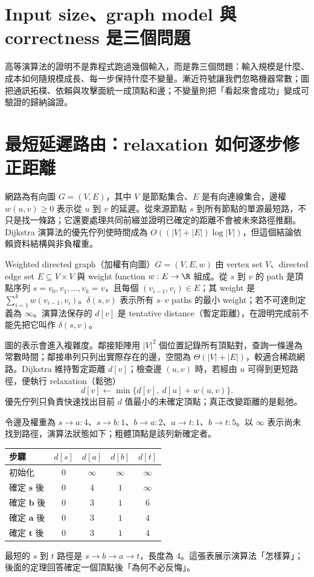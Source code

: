 \documentclass[11pt,a4paper,oneside,openany]{book}
\begin{document}
\section{Input size、graph model 與 correctness 是三個問題}
高等演算法的證明不是靠程式跑過幾個輸入，而是靠三個問題：輸入規模是什麼、成本如何隨規模成長、每一步保持什麼不變量。漸近符號讓我們忽略機器常數；圖把通訊拓樸、依賴與攻擊面統一成頂點和邊；不變量則把「看起來會成功」變成可驗證的歸納論證。

\section{最短延遲路由：relaxation 如何逐步修正距離}
網路為有向圖 $G=(V,E)$，其中 $V$ 是節點集合、$E$ 是有向連線集合，邊權 $w(u,v)\ge0$ 表示從 $u$ 到 $v$ 的延遲。從來源節點 $s$ 到所有節點的單源最短路，不只是找一條路；它還要處理共同前綴並證明已確定的距離不會被未來路徑推翻。Dijkstra 演算法的優先佇列使時間成為 $O((|V|+|E|)\log |V|)$，但這個結論依賴資料結構與非負權重。

\begin{definition}
Weighted directed graph（加權有向圖）$G=(V,E,w)$ 由 vertex set $V$、directed edge set $E\subseteq V\times V$ 與 weight function $w:E\to\R$ 組成。從 $s$ 到 $v$ 的 path 是頂點序列 $s=v_0,v_1,\ldots,v_k=v$，且每個 $(v_{i-1},v_i)\in E$；其 weight 是 $\sum_{i=1}^k w(v_{i-1},v_i)$。$\delta(s,v)$ 表示所有 $s$--$v$ paths 的最小 weight；若不可達則定義為 $\infty$。演算法保存的 $d[v]$ 是 tentative distance（暫定距離），在證明完成前不能先把它叫作 $\delta(s,v)$。
\end{definition}

圖的表示會進入複雜度。鄰接矩陣用 $|V|^2$ 個位置記錄所有頂點對，查詢一條邊為常數時間；鄰接串列只列出實際存在的邊，空間為 $\Theta(|V|+|E|)$，較適合稀疏網路。Dijkstra 維持暫定距離 $d[v]$；檢查邊 $(u,v)$ 時，若經由 $u$ 可得到更短路徑，便執行 relaxation（鬆弛）
\[
 d[v]\leftarrow\min\{d[v],\ d[u]+w(u,v)\}.
\]
優先佇列只負責快速找出目前 $d$ 值最小的未確定頂點；真正改變距離的是鬆弛。

\begin{example}
令邊及權重為 $s\to a:4$、$s\to b:1$、$b\to a:2$、$a\to t:1$、$b\to t:5$。以 $\infty$ 表示尚未找到路徑，演算法狀態如下；粗體頂點是該列新確定者。
\begin{center}
\begin{tabular}{@{}lcccc@{}}
\toprule
步驟 & $d[s]$ & $d[a]$ & $d[b]$ & $d[t]$ \\
\midrule
初始化 & $0$ & $\infty$ & $\infty$ & $\infty$ \\
確定 $\mathbf{s}$ 後 & $0$ & $4$ & $1$ & $\infty$ \\
確定 $\mathbf{b}$ 後 & $0$ & $3$ & $1$ & $6$ \\
確定 $\mathbf{a}$ 後 & $0$ & $3$ & $1$ & $4$ \\
確定 $\mathbf{t}$ 後 & $0$ & $3$ & $1$ & $4$ \\
\bottomrule
\end{tabular}
\end{center}
最短的 $s$ 到 $t$ 路徑是 $s\to b\to a\to t$，長度為 4。這張表展示演算法「怎樣算」；後面的定理回答確定一個頂點後「為何不必反悔」。
\end{example}
\end{document}
